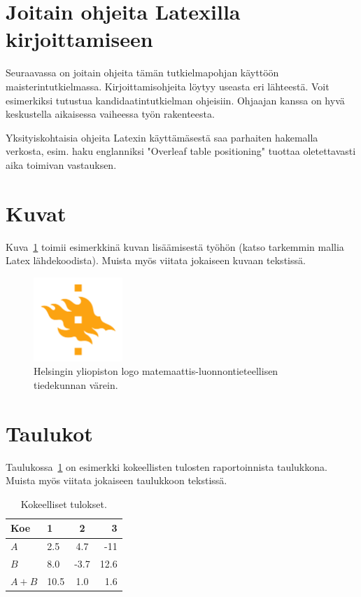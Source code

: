 \section{Joitain ohjeita Latexilla kirjoittamiseen}

Seuraavassa on joitain ohjeita tämän tutkielmapohjan käyttöön maisterintutkielmassa. Kirjoittamisohjeita löytyy useasta eri lähteestä. Voit esimerkiksi tutustua kandidaatintutkielman ohjeisiin.
Ohjaajan kanssa on hyvä keskustella aikaisessa vaiheessa työn rakenteesta.

Yksityiskohtaisia ohjeita Latexin käyttämäsestä saa parhaiten hakemalla verkosta, esim. haku englanniksi "Overleaf table positioning" tuottaa oletettavasti aika toimivan vastauksen.

\section{Kuvat}
Kuva~\ref{fig:logo-fi} toimii esimerkkinä kuvan lisäämisestä työhön (katso tarkemmin mallia Latex lähdekoodista). Muista myös viitata jokaiseen kuvaan tekstissä.

\begin{figure}[ht] %
\centering
\includegraphics[width=0.3\textwidth]{template/figures/HY-logo-ml.png}
\caption{Helsingin yliopiston logo matemaattis-luonnontieteellisen tiedekunnan värein.\label{fig:logo-fi}}
\end{figure}

\newpage %
\section{Taulukot}

Taulukossa~\ref{table:results-fi} on esimerkki kokeellisten tulosten raportoinnista taulukkona. Muista myös viitata jokaiseen taulukkoon tekstissä.
\begin{table}[ht]
\centering
\caption{Kokeelliset tulokset.\label{table:results-fi}}
\begin{tabular}{l||l c r}
Koe & 1 & 2 & 3 \\
\hline \hline
$A$ & 2.5 & 4.7 & -11 \\
$B$ & 8.0 & -3.7 & 12.6 \\
$A+B$ & 10.5 & 1.0 & 1.6 \\
\hline
%
\end{tabular}
\end{table}

